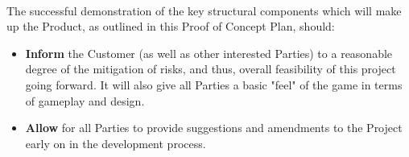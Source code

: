 \documentclass{article}
\begin{document}
\paragraph{}The successful demonstration of the key structural components which will make up the Product, as outlined in this Proof of Concept Plan, should:
\begin{itemize}
    \item \textbf{Inform} the Customer (as well as other interested Parties) to a reasonable degree of the mitigation of risks, and thus, overall feasibility of this project going forward. It will also give all Parties a basic "feel" of the game in terms of gameplay and design. 
    \item \textbf{Allow} for all Parties to provide suggestions and amendments to the Project early on in the development process.
\end{itemize}
\end{document}
